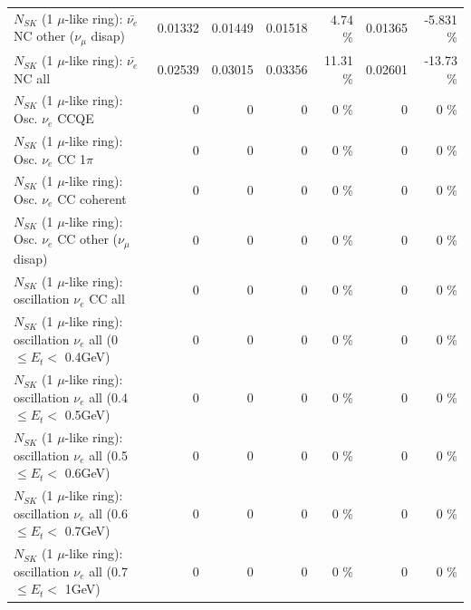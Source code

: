 \begin{table}
\begin{tabular}{| l | r | r | r  r | r  r |}
          $N_{SK}$ (1 $\mu$-like ring): $\bar{\nu_e}$ NC other ($\nu_\mu$ disap) &         0.01332 &         0.01449 &         0.01518 &     4.74 \%  &         0.01365 &   -5.831 \%  \\ 
                            $N_{SK}$ (1 $\mu$-like ring): $\bar{\nu_{e}}$ NC all &         0.02539 &         0.03015 &         0.03356 &    11.31 \%  &         0.02601 &   -13.73 \%  \\ 
\hline
\hline
\hline
                                 $N_{SK}$ (1 $\mu$-like ring): Osc. $\nu_e$ CCQE &               0 &               0 &               0 &        0 \%  &               0 &        0 \%  \\ 
                            $N_{SK}$ (1 $\mu$-like ring): Osc. $\nu_e$ CC 1$\pi$ &               0 &               0 &               0 &        0 \%  &               0 &        0 \%  \\ 
                          $N_{SK}$ (1 $\mu$-like ring): Osc. $\nu_e$ CC coherent &               0 &               0 &               0 &        0 \%  &               0 &        0 \%  \\ 
           $N_{SK}$ (1 $\mu$-like ring): Osc. $\nu_e$ CC other ($\nu_\mu$ disap) &               0 &               0 &               0 &        0 \%  &               0 &        0 \%  \\ 
                        $N_{SK}$ (1 $\mu$-like ring): oscillation $\nu_e$ CC all &               0 &               0 &               0 &        0 \%  &               0 &        0 \%  \\ 
\hline
$N_{SK}$ (1 $\mu$-like ring): oscillation $\nu_{e}$ all (0 $\leq E_{t} <$ 0.4GeV) &               0 &               0 &               0 &        0 \%  &               0 &        0 \%  \\ 
$N_{SK}$ (1 $\mu$-like ring): oscillation $\nu_{e}$ all (0.4 $\leq E_{t} <$ 0.5GeV) &               0 &               0 &               0 &        0 \%  &               0 &        0 \%  \\ 
$N_{SK}$ (1 $\mu$-like ring): oscillation $\nu_{e}$ all (0.5 $\leq E_{t} <$ 0.6GeV) &               0 &               0 &               0 &        0 \%  &               0 &        0 \%  \\ 
$N_{SK}$ (1 $\mu$-like ring): oscillation $\nu_{e}$ all (0.6 $\leq E_{t} <$ 0.7GeV) &               0 &               0 &               0 &        0 \%  &               0 &        0 \%  \\ 
$N_{SK}$ (1 $\mu$-like ring): oscillation $\nu_{e}$ all (0.7 $\leq E_{t} <$ 1GeV) &               0 &               0 &               0 &        0 \%  &               0 &        0 \%  \\ 

\end{tabular}
\end{table}
